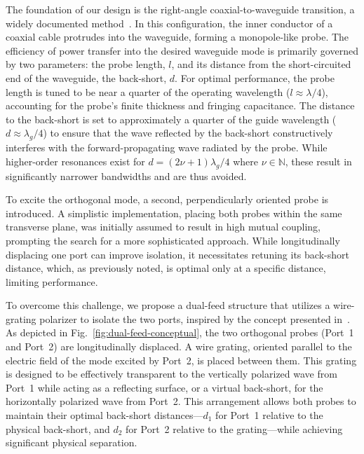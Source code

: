 \documentclass[journal]{IEEEtran}
\begin{document}
The foundation of our design is the right-angle coaxial-to-waveguide transition, a widely documented method~\cite{fabregas-et-al:coaxial-to-rectangular-waveguide-transitions}. In this configuration, the inner conductor of a coaxial cable protrudes into the waveguide, forming a monopole-like probe. The efficiency of power transfer into the desired waveguide mode is primarily governed by two parameters: the probe length, $l$, and its distance from the short-circuited end of the waveguide, the back-short, $d$. For optimal performance, the probe length is tuned to be near a quarter of the operating wavelength ($l \approx \lambda/4$), accounting for the probe's finite thickness and fringing capacitance. The distance to the back-short is set to approximately a quarter of the guide wavelength ($d \approx \lambda_g/4$) to ensure that the wave reflected by the back-short constructively interferes with the forward-propagating wave radiated by the probe. While higher-order resonances exist for $d = (2\nu+1)\lambda_g/4$ where $\nu \in \mathbb{N}$, these result in significantly narrower bandwidths and are thus avoided.

To excite the orthogonal mode, a second, perpendicularly oriented probe is introduced. A simplistic implementation, placing both probes within the same transverse plane, was initially assumed to result in high mutual coupling, prompting the search for a more sophisticated approach. While longitudinally displacing one port can improve isolation, it necessitates retuning its back-short distance, which, as previously noted, is optimal only at a specific distance, limiting performance.

To overcome this challenge, we propose a dual-feed structure that utilizes a wire-grating polarizer to isolate the two ports, inspired by the concept presented in~\cite{karki-et-al:dual-polarized-probe-for-planar-near-field-measurement}. As depicted in Fig.~\ref{fig:dual-feed-conceptual}, the two orthogonal probes (Port~1 and Port~2) are longitudinally displaced. A wire grating, oriented parallel to the electric field of the mode excited by Port~2, is placed between them. This grating is designed to be effectively transparent to the vertically polarized wave from Port~1 while acting as a reflecting surface, or a virtual back-short, for the horizontally polarized wave from Port~2. This arrangement allows both probes to maintain their optimal back-short distances---$d_1$ for Port~1 relative to the physical back-short, and $d_2$ for Port~2 relative to the grating---while achieving significant physical separation.
\end{document}
